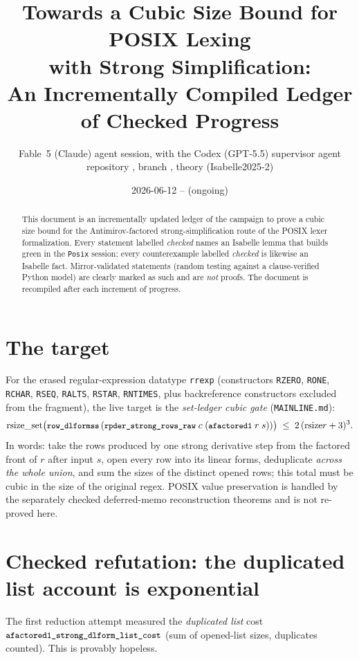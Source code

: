 \documentclass[11pt]{article}
\title{Towards a Cubic Size Bound for POSIX Lexing\\
with Strong Simplification:\\
\large An Incrementally Compiled Ledger of Checked Progress}
\author{Fable~5 (Claude) agent session, with the Codex (GPT-5.5) supervisor agent\\
\small repository \code{posix-codex}, branch \code{codex/backref-values}, theory \code{Posix} (Isabelle2025-2)}
\date{2026-06-12 -- (ongoing)}
\newcommand{\rsize}{\mathrm{rsize}}
\newcommand{\rsizeset}{\mathrm{rsize\_set}}
\newcommand{\code}[1]{\texttt{\small #1}}
\begin{document}
\maketitle

\begin{abstract}
This document is an incrementally updated ledger of the campaign to prove a
cubic size bound for the Antimirov-factored strong-simplification route of
the POSIX lexer formalization.  Every statement labelled \emph{checked} names
an Isabelle lemma that builds green in the \code{Posix} session; every
counterexample labelled \emph{checked} is likewise an Isabelle fact.
Mirror-validated statements (random testing against a clause-verified Python
model) are clearly marked as such and are \emph{not} proofs.  The document is
recompiled after each increment of progress.
\end{abstract}

\tableofcontents

\section{The target}

For the erased regular-expression datatype \code{rrexp} (constructors
\code{RZERO}, \code{RONE}, \code{RCHAR}, \code{RSEQ}, \code{RALTS},
\code{RSTAR}, \code{RNTIMES}, plus backreference constructors excluded from
the fragment), the live target is the \emph{set-ledger cubic gate}
(\code{MAINLINE.md}):
\[
\rsizeset\bigl(\code{row\_dlformss}\,(\code{rpder\_strong\_rows\_raw}\;c\;(\code{afactored1}\;r\;s))\bigr)
\;\le\; 2\,(\rsize r + 3)^3 .
\]
In words: take the rows produced by one strong derivative step from the
factored front of $r$ after input $s$, open every row into its linear forms,
deduplicate \emph{across the whole union}, and sum the sizes of the distinct
opened rows; this total must be cubic in the size of the original regex.
POSIX value preservation is handled by the separately checked
deferred-memo reconstruction theorems and is not re-proved here.

\section{Checked refutation: the duplicated list account is exponential}

The first reduction attempt measured the \emph{duplicated list} cost
$\code{afactored1\_strong\_dlform\_list\_cost}$ (sum of opened-list sizes,
duplicates counted).  This is provably hopeless.
\end{document}
